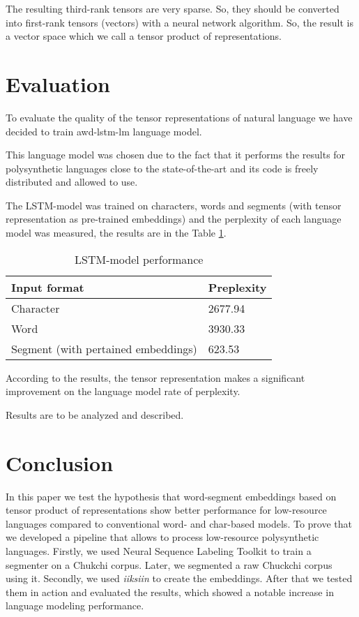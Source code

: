 \documentclass[leqno]{article}
\begin{document}
The resulting third-rank tensors are very sparse. So, they
should be converted into first-rank tensors (vectors) with a neural network algorithm.
So, the result is a vector space which we call a tensor product of representations.
    
\section{Evaluation}

To evaluate the quality of the tensor representations of natural language we have decided to train awd-lstm-lm \parencite{awd-lstm} language model.

This language model was chosen due to the fact that it performs the results for polysynthetic languages close to the state-of-the-art and its code is freely distributed and allowed to use.

The LSTM-model was trained on characters, words and segments (with  tensor representation as pre-trained embeddings) and the perplexity of each language model was measured, the results are in the Table \ref{tab:result}. 
\begin{table}[h]
\centering
\begin{tabular}{|l|l|}
\hline
Input format                        & Preplexity   \\ \hline
Character                           & 2677.94 \\ \hline
Word                                & 3930.33 \\ \hline
Segment (with pertained embeddings) & 623.53 \\ \hline
\end{tabular}
\caption{LSTM-model performance}
\label{tab:result}
\end{table}

According to the results, the tensor representation makes a significant improvement on the language model rate of perplexity.


Results are to be analyzed and described.

\section{Conclusion}
In this paper we test the hypothesis that word-segment embeddings based on tensor product
of representations show better performance for low-resource languages compared to conventional word- and char-based models. To prove that we developed a pipeline that allows to process low-resource polysynthetic languages. Firstly, we used Neural Sequence Labeling Toolkit \parencite{yang2018ncrf} to train a segmenter on a Chukchi corpus. Later, we segmented a raw Chuckchi corpus using it. Secondly, we used \textit{iiksiin} \parencite{iiksiin} to create the embeddings. After that we tested them in action and evaluated the results, which showed a notable increase in language modeling performance.
\end{document}
